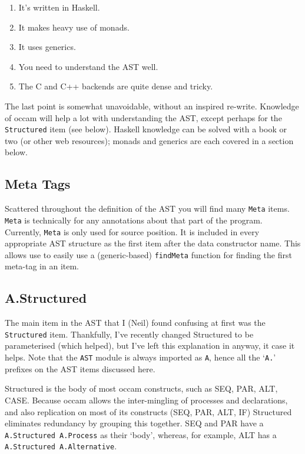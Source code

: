 \documentclass[a4wide]{article}
\begin{document}
\begin{enumerate}
\item It's written in Haskell.
\item It makes heavy use of monads.
\item It uses generics.
\item You need to understand the AST well.
\item The C and C++ backends are quite dense and tricky.
\end{enumerate}

The last point is somewhat unavoidable, without an inspired re-write.  Knowledge of occam will help
a lot with understanding the AST, except perhaps for the \lstinline|Structured| item (see below).
Haskell knowledge can be solved with a book or two (or other web resources); monads and generics
are each covered in a section below.

\subsection{Meta Tags}

Scattered throughout the definition of the AST you will find many \lstinline|Meta| items.
\lstinline|Meta| is technically for any annotations about that part of the program.  Currently, \lstinline|Meta| is only
used for source position.  It is included in every appropriate AST structure as the first item
after the data constructor name.  This allows use to easily use a (generic-based) 
\lstinline|findMeta| function for finding the first meta-tag in an item.

\subsection{A.Structured}

The main item in the AST that I (Neil) found confusing at first was the \lstinline|Structured| item.  
Thankfully, I've recently changed Structured to be parameterised (which helped), but I've left this explanation
in anyway, it case it helps.  Note that the \lstinline|AST| module is always imported as \lstinline|A|,
hence all the `\lstinline|A.|' prefixes on the AST items discussed here.

Structured is the body of most occam constructs,
such as SEQ, PAR, ALT, CASE.  Because occam allows the inter-mingling of processes and declarations,
and also replication on most of its constructs (SEQ, PAR, ALT, IF) Structured eliminates redundancy
by grouping this together.  SEQ and PAR have a \lstinline|A.Structured A.Process| as their `body',
whereas, for example, ALT has a \lstinline|A.Structured A.Alternative|.
\end{document}
